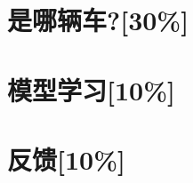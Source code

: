 \documentclass{ctexart}
\begin{document}
			

	\section{是哪辆车?[30\%]}
	\subsection{}
	\subsection{}
	\subsection{}
	\subsection{}
	\section{模型学习[10\%]}
	\subsection{}
	\section{反馈[10\%]}
	
	



	
\end{document}
